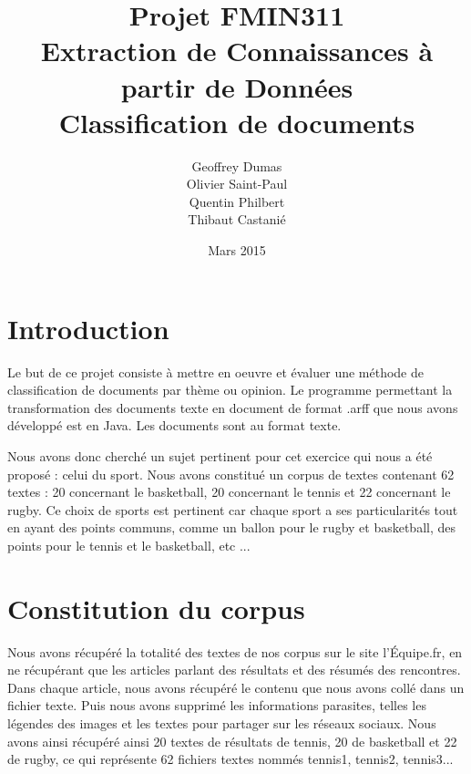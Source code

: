\documentclass[a4paper,11pt]{article}
\begin{document}
\title{Projet FMIN311\\Extraction de Connaissances à partir de Données\\\textbf{Classification de documents}}
\author{Geoffrey Dumas\\Olivier Saint-Paul\\Quentin Philbert\\Thibaut Castanié}
\date{Mars 2015}

\maketitle
\thispagestyle{empty}

\newpage


\setcounter{page}{1}
\tableofcontents

\newpage

\section*{Introduction}
Le but de ce projet consiste à mettre en oeuvre et évaluer une méthode de classification de documents par thème ou opinion. Le programme  permettant la transformation des documents texte en document de format .arff que nous avons développé est en Java. Les documents sont au format texte.

Nous avons donc cherché un sujet pertinent pour cet exercice qui nous a été proposé : celui du sport. Nous avons constitué un corpus de textes contenant 62 textes : 20 concernant le basketball, 20 concernant le tennis et 22 concernant le rugby. Ce choix de sports est pertinent car chaque sport a ses particularités tout en ayant des points communs, comme un ballon pour le rugby et basketball, des points pour le tennis et le basketball, etc ...

\newpage

\section{Constitution du corpus}
Nous avons récupéré la totalité des textes de nos corpus sur le site l’Équipe.fr, en ne récupérant que les articles parlant des résultats et des résumés des rencontres. Dans chaque article, nous avons récupéré le contenu que nous avons collé dans un fichier texte. Puis nous avons supprimé les informations parasites, telles les légendes des images et les textes pour partager sur les réseaux sociaux. Nous avons ainsi récupéré ainsi 20 textes de résultats de tennis, 20 de basketball et 22 de rugby, ce qui représente 62 fichiers textes nommés tennis1, tennis2, tennis3...
\end{document}
